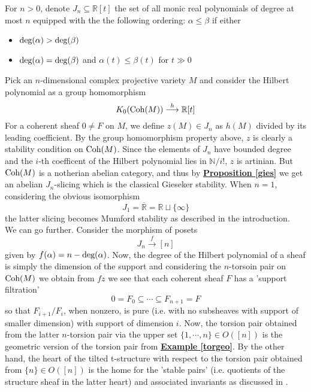 \begin{exmp}\label{cohh}
  For $n > 0$, denote $J_n \subseteq \mathbb{R}[t]$ the set of all monic real polynomials of degree at most $n$ equipped with the the following ordering: $\alpha \le \beta$ if either
  \begin{itemize}
  \item $\textnormal{deg}(\alpha) > \textnormal{deg}(\beta)$
  \item $\textnormal{deg}(\alpha) = \textnormal{deg}(\beta)$ and $\alpha(t) \le \beta(t)$ for $t \gg 0$
  \end{itemize}
  Pick an $n$-dimensional complex projective variety $M$ and consider the Hilbert polynomial as a group homomorphism $$K_0(\textnormal{Coh}(M)) \overset{h}{\longrightarrow} \mathbb{R}[t]$$
  For a coherent sheaf $0\not=F$ on $M$, we define $z(M) \in J_n$ as $h(M)$ divided by its leading coefficient. By the group homomorphism property above, $z$ is clearly a stability condition on $\textnormal{Coh}(M)$. Since the elements of $J_n$ have bounded degree and the $i$-th coefficent of the Hilbert polynomial lies in $\mathbb{N}/i!$, $z$ is artinian. But $\textnormal{Coh}(M)$ is a notherian abelian category, and thus by \hyperref[gies]{\textbf{Proposition \ref*{gies}}} we get an abelian $J_n$-slicing which is the classical Gieseker stability. When $n=1$, considering the obvious isomorphism $$J_1=\overline{\mathbb{R}}=\mathbb{R} \sqcup \{ \infty \}$$ the latter slicing becomes Mumford stability as described in the introduction. \\
  We can go further. Consider the morphism of posets $$J_n \overset{f}{\longrightarrow} [n]$$
  given by $f(\alpha)=n-\textnormal{deg}(\alpha)$. Now, the degree of the Hilbert polynomial of a sheaf is simply the dimension of the support and considering the  $n$-torsoin pair on $\textnormal{Coh}(M)$ we obtain from $fz$ we see that each coherent sheaf $F$ has a 'support filtration' $$0=F_0 \subseteq \cdots \subseteq F_{n+1}=F$$ 
so that $F_{i+1}/F_i$, when nonzero, is pure (i.e. with no subsheaves with support of smaller dimension) with support of dimension $i$. Now,  the torsion pair obtained from the latter $n$-torsion pair via the upper set $\{ 1, \cdots, n \} \in O([n])$ is the geometric version of the torsion pair from \hyperref[torgeo]{\textbf{Example \ref*{torgeo}}}. By the other hand, the heart of the tilted t-structure with respect to the torsion pair obtained from $\{n\} \in O([n])$ is the home for the 'stable pairs' (i.e. quotients of the structure sheaf in the latter heart) and associated invariants as discussed in \cite{pt}. 
\end{exmp}

